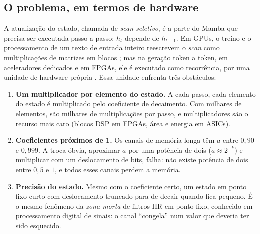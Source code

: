 \documentclass[12pt]{article}
\begin{document}
\subsection{O problema, em termos de hardware}
A atualização do estado, chamada de \emph{scan seletivo}, é a parte do Mamba que precisa ser executada passo a passo: $h_t$ depende de $h_{t-1}$. Em GPUs, o treino e o processamento de um texto de entrada inteiro reescrevem o \emph{scan} como multiplicações de matrizes em blocos \cite{dao2024transformers}; mas na geração token a token, em aceleradores dedicados e em FPGAs, ele é executado como recorrência, por uma unidade de hardware própria \cite{li2024marca,wei2025lightmamba,fastmamba2025}. Essa unidade enfrenta três obstáculos:
\begin{enumerate}
  \item \textbf{Um multiplicador por elemento do estado.} A cada passo, cada elemento do estado é multiplicado pelo coeficiente de decaimento. Com milhares de elementos, são milhares de multiplicações por passo, e multiplicadores são o recurso mais caro (blocos DSP em FPGAs, área e energia em ASICs).
  \item \textbf{Coeficientes próximos de 1.} Os canais de memória longa têm $a$ entre $0{,}90$ e $0{,}999$. A troca óbvia, aproximar $a$ por uma potência de dois ($a \approx 2^{-k}$) e multiplicar com um deslocamento de bits, falha: não existe potência de dois entre $0{,}5$ e $1$, e todos esses canais perdem a memória.
  \item \textbf{Precisão do estado.} Mesmo com o coeficiente certo, um estado em ponto fixo curto com deslocamento truncado para de decair quando fica pequeno. É o mesmo fenômeno da \emph{zona morta} de filtros IIR em ponto fixo, conhecido em processamento digital de sinais: o canal ``congela'' num valor que deveria ter sido esquecido.
\end{enumerate}
\end{document}
